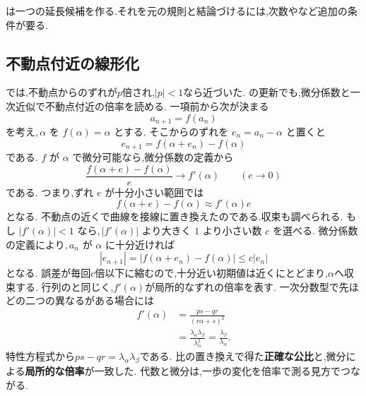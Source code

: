 は一つの延長候補を作る.それを元の規則と結論づけるには,次数やなど追加の条件が要る.

\subsection{不動点付近の線形化}\label{節：不動点付近の線形化}

では,不動点からのずれが$p$倍され,$|p|<1$なら近づいた.
の更新でも,微分係数と一次近似で不動点付近の倍率を読める.
一項前から次が決まる
\[
  a_{n+1}=f(a_n)
\]
を考え,$\,\alpha$ を $f(\alpha)=\alpha$ とする.
そこからのずれを $e_n=a_n-\alpha$ と置くと
\[
  e_{n+1}=f(\alpha+e_n)-f(\alpha)
\]
である.
$f$ が $\alpha$ で微分可能なら,微分係数の定義から
\[
  \frac{f(\alpha+e)-f(\alpha)}{e}\longrightarrow f'(\alpha)
  \qquad(e\longrightarrow0)
\]
である.
つまり,ずれ $e$ が十分小さい範囲では
\[
  f(\alpha+e)-f(\alpha)\approx f'(\alpha)e
\]
となる.
不動点の近くで曲線を接線に置き換えたのである.収束も調べられる.
もし $|f'(\alpha)|<1$ なら,$\,|f'(\alpha)|$ より大きく $1$ より小さい数 $c$ を選べる.
微分係数の定義により,$\,a_n$ が $\alpha$ に十分近ければ
\[
  |e_{n+1}|
  =|f(\alpha+e_n)-f(\alpha)|
  \le c|e_n|
\]
となる.
誤差が毎回$c$倍以下に縮むので,十分近い初期値は近くにとどまり,$\alpha$へ収束する.
行列のと同じく,$f'(\alpha)$が局所的なずれの倍率を表す.
一次分数型で先ほどの二つの異なるがある場合には
\[
  \begin{aligned}
    f'(\alpha)
    &=\frac{ps-qr}{(r\alpha+s)^2}\\
    &=\frac{\lambda_\alpha\lambda_\beta}{\lambda_\alpha^2}
    =\frac{\lambda_\beta}{\lambda_\alpha}.
  \end{aligned}
\]
特性方程式から$ps-qr=\lambda_\alpha\lambda_\beta$である.
比の置き換えで得た\textbf{正確な公比}と,微分による\textbf{局所的な倍率}が一致した.
代数と微分は,一歩の変化を倍率で測る見方でつながる.


